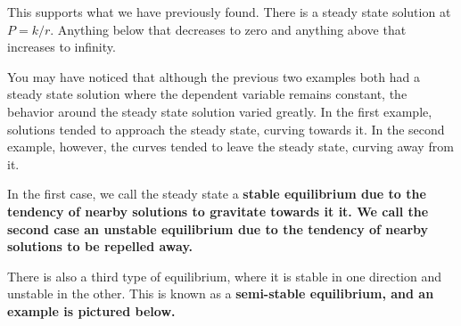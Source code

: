 \begin{example}
\begin{figure}[h!]
\end{figure}
This supports what we have previously found. There is a steady state solution at $P = k/r$. Anything below that decreases to zero and anything above that increases to infinity. 
\end{example}
You may have noticed that although the previous two examples both had a steady state solution where the dependent variable remains constant, the behavior around the steady state solution varied greatly. In the first example, solutions tended to approach the steady state, curving towards it. In the second example, however, the curves tended to leave the steady state, curving away from it. \par
In the first case, we call the steady state a \bf{stable equilibrium} due to the tendency of nearby solutions to gravitate towards it it. We call the second case an \bf{unstable equilibrium} due to the tendency of nearby solutions to be repelled away. \par
There is also a third type of equilibrium, where it is stable in one direction and unstable in the other. This is known as a \bf{semi-stable equilibrium}, and an example is pictured below. \newpage
